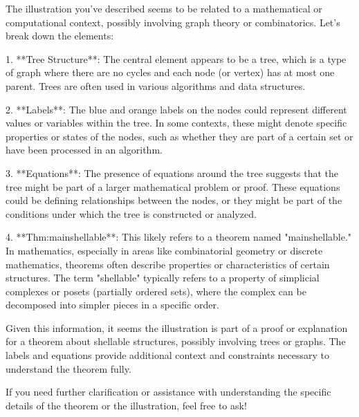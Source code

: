 The illustration you've described seems to be related to a mathematical or computational context, possibly involving graph theory or combinatorics. Let's break down the elements:

1. **Tree Structure**: The central element appears to be a tree, which is a type of graph where there are no cycles and each node (or vertex) has at most one parent. Trees are often used in various algorithms and data structures.

2. **Labels**: The blue and orange labels on the nodes could represent different values or variables within the tree. In some contexts, these might denote specific properties or states of the nodes, such as whether they are part of a certain set or have been processed in an algorithm.

3. **Equations**: The presence of equations around the tree suggests that the tree might be part of a larger mathematical problem or proof. These equations could be defining relationships between the nodes, or they might be part of the conditions under which the tree is constructed or analyzed.

4. **Thm:mainshellable**: This likely refers to a theorem named "mainshellable." In mathematics, especially in areas like combinatorial geometry or discrete mathematics, theorems often describe properties or characteristics of certain structures. The term "shellable" typically refers to a property of simplicial complexes or posets (partially ordered sets), where the complex can be decomposed into simpler pieces in a specific order.

Given this information, it seems the illustration is part of a proof or explanation for a theorem about shellable structures, possibly involving trees or graphs. The labels and equations provide additional context and constraints necessary to understand the theorem fully.

If you need further clarification or assistance with understanding the specific details of the theorem or the illustration, feel free to ask!